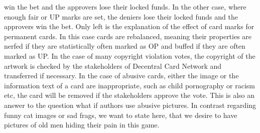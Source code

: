 \documentclass{article}
\begin{document}
win the bet and the approvers lose their locked funds. In the other case, where enough fair or UP marks are set, the deniers lose their locked funds and the approvers win the bet. Only left is the explanation of the effect of card marks for permanent cards. In this case cards are rebalanced, meaning their properties are nerfed if they are statistically often marked as OP and buffed if they are often marked as UP. In the case of many copyright violation votes, the copyright of the artwork is checked by the stakeholders of Decentral Card Network and transferred if necessary. In the case of abusive cards, either the image or the information text of a card are inappropriate, such as child pornography or racism etc, the card will be removed if the stakeholders approve the vote. This is also an answer to the question what if authors use abusive pictures. In contrast regarding funny cat images or sad frags, we want to state here, that we desire to have pictures of old men hiding their pain in this game.
%
\end{document}

